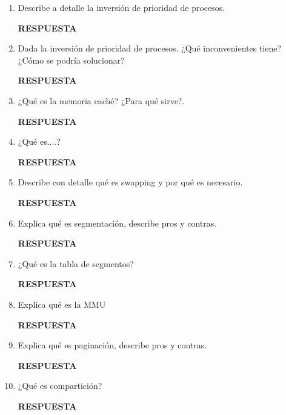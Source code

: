 \documentclass[12pt]{article}
\begin{document}
\begin{enumerate}
    \item Describe a detalle la inversión de prioridad de procesos.
    \vspace{2mm}

    \textbf{RESPUESTA}

    \item Dada la inversión de prioridad de procesos. ¿Qué inconvenientes tiene? ¿Cómo se podría solucionar?
    \vspace{2mm}
    
    \textbf{RESPUESTA}
    
    \item ¿Qué es la memoria caché? ¿Para qué sirve?.
    \vspace{2mm}

    \textbf{RESPUESTA}

    \item ¿Qué es....?
    \vspace{2mm}

    \textbf{RESPUESTA}

    \item Describe con detalle qué es swapping y por qué es necesario. 
    \vspace{2mm}

    \textbf{RESPUESTA}

    \item Explica qué es segmentación, describe pros y contras.
    \vspace{2mm}

    \textbf{RESPUESTA}

    \item ¿Qué es la tabla de segmentos?  
    \vspace{2mm}

    \textbf{RESPUESTA}

    \item Explica qué es la MMU
    \vspace{2mm}

    \textbf{RESPUESTA}
    
    \item Explica qué es paginación, describe pros y contras.
    \vspace{2mm}

    \textbf{RESPUESTA}

    \item ¿Qué es compartición?
    \vspace{2mm}
    
    \textbf{RESPUESTA}


\end{enumerate}
\end{document}
